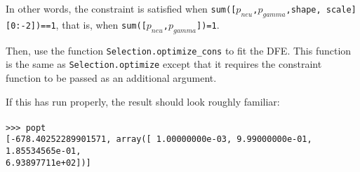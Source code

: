 \documentclass[11pt]{article}
\begin{document}


In other words, the constraint is satisfied when \texttt{sum([$p_{neu}$,$p_{gamma}$,shape, scale][0:-2])==1}, that is, when \texttt{sum([$p_{neu}$,$p_{gamma}$])=1}.

Then, use the function \texttt{Selection.optimize\_cons} to fit the DFE. This function is the same as \texttt{Selection.optimize} except that it requires the constraint function to be passed as an additional argument.



If this has run properly, the result should look roughly familiar: \\ \\
\texttt{>>> popt} \\
\texttt{[-678.40252289901571, array([  1.00000000e-03,   9.99000000e-01,   1.85534565e-01,} \\
\texttt{6.93897711e+02])]}

{}

\end{document}
